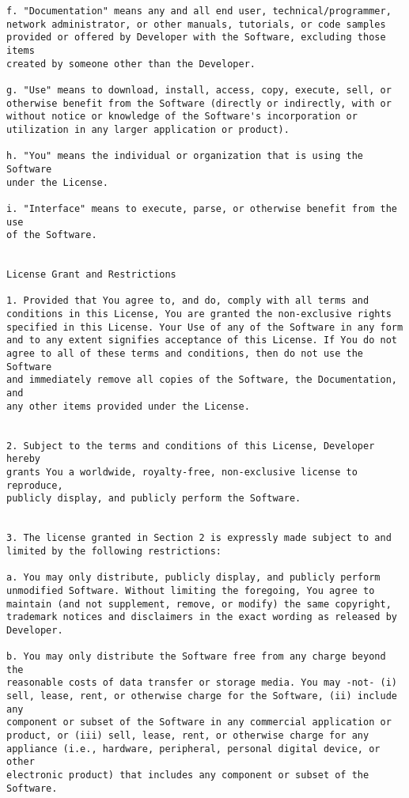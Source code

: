 \documentclass{report}
\begin{document}
{\begin{verbatim}
f. "Documentation" means any and all end user, technical/programmer, 
network administrator, or other manuals, tutorials, or code samples 
provided or offered by Developer with the Software, excluding those items 
created by someone other than the Developer. 

g. "Use" means to download, install, access, copy, execute, sell, or 
otherwise benefit from the Software (directly or indirectly, with or 
without notice or knowledge of the Software's incorporation or 
utilization in any larger application or product).

h. "You" means the individual or organization that is using the Software 
under the License. 

i. "Interface" means to execute, parse, or otherwise benefit from the use 
of the Software. 


License Grant and Restrictions

1. Provided that You agree to, and do, comply with all terms and 
conditions in this License, You are granted the non-exclusive rights 
specified in this License. Your Use of any of the Software in any form 
and to any extent signifies acceptance of this License. If You do not 
agree to all of these terms and conditions, then do not use the Software 
and immediately remove all copies of the Software, the Documentation, and 
any other items provided under the License. 


2. Subject to the terms and conditions of this License, Developer hereby 
grants You a worldwide, royalty-free, non-exclusive license to reproduce, 
publicly display, and publicly perform the Software.


3. The license granted in Section 2 is expressly made subject to and 
limited by the following restrictions: 

a. You may only distribute, publicly display, and publicly perform 
unmodified Software. Without limiting the foregoing, You agree to 
maintain (and not supplement, remove, or modify) the same copyright, 
trademark notices and disclaimers in the exact wording as released by 
Developer. 

b. You may only distribute the Software free from any charge beyond the 
reasonable costs of data transfer or storage media. You may -not- (i) 
sell, lease, rent, or otherwise charge for the Software, (ii) include any 
component or subset of the Software in any commercial application or 
product, or (iii) sell, lease, rent, or otherwise charge for any 
appliance (i.e., hardware, peripheral, personal digital device, or other 
electronic product) that includes any component or subset of the 
Software. 



\end{verbatim}}
\end{document}
